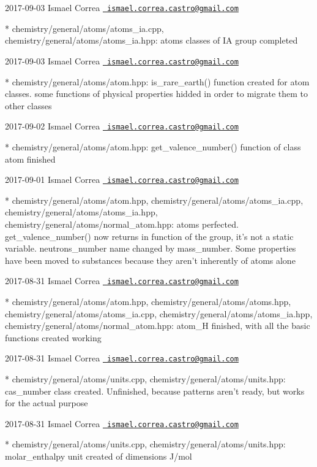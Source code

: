  2017-\/09-\/03 Ismael Correa \href{mailto:ismael.correa.castro@gmail.com}{\texttt{ ismael.\+correa.\+castro@gmail.\+com}} \begin{DoxyVerb}* chemistry/general/atoms/atoms_ia.cpp,
chemistry/general/atoms/atoms_ia.hpp: atoms classes of IA group
completed
\end{DoxyVerb}
 2017-\/09-\/03 Ismael Correa \href{mailto:ismael.correa.castro@gmail.com}{\texttt{ ismael.\+correa.\+castro@gmail.\+com}} \begin{DoxyVerb}* chemistry/general/atoms/atom.hpp: is_rare_earth() function created
for atom classes. some functions of physical properties hidded in
order to migrate them to other classes
\end{DoxyVerb}
 2017-\/09-\/02 Ismael Correa \href{mailto:ismael.correa.castro@gmail.com}{\texttt{ ismael.\+correa.\+castro@gmail.\+com}} \begin{DoxyVerb}* chemistry/general/atoms/atom.hpp: get_valence_number() function of
class atom finished
\end{DoxyVerb}
 2017-\/09-\/01 Ismael Correa \href{mailto:ismael.correa.castro@gmail.com}{\texttt{ ismael.\+correa.\+castro@gmail.\+com}} \begin{DoxyVerb}* chemistry/general/atoms/atom.hpp,
chemistry/general/atoms/atoms_ia.cpp,
chemistry/general/atoms/atoms_ia.hpp,
chemistry/general/atoms/normal_atom.hpp: atoms perfected.
get_valence_number() now returns in function of the group, it's not
a static variable. neutrons_number name changed by mass_number. Some
properties have been moved to substances because they aren't
inherently of atoms alone
\end{DoxyVerb}
 2017-\/08-\/31 Ismael Correa \href{mailto:ismael.correa.castro@gmail.com}{\texttt{ ismael.\+correa.\+castro@gmail.\+com}} \begin{DoxyVerb}* chemistry/general/atoms/atom.hpp,
chemistry/general/atoms/atoms.hpp,
chemistry/general/atoms/atoms_ia.cpp,
chemistry/general/atoms/atoms_ia.hpp,
chemistry/general/atoms/normal_atom.hpp: atom_H finished, with all
the basic functions created working
\end{DoxyVerb}
 2017-\/08-\/31 Ismael Correa \href{mailto:ismael.correa.castro@gmail.com}{\texttt{ ismael.\+correa.\+castro@gmail.\+com}} \begin{DoxyVerb}* chemistry/general/atoms/units.cpp,
chemistry/general/atoms/units.hpp: cas_number class created.
Unfinished, because patterns aren't ready, but works for the actual
purpose
\end{DoxyVerb}
 2017-\/08-\/31 Ismael Correa \href{mailto:ismael.correa.castro@gmail.com}{\texttt{ ismael.\+correa.\+castro@gmail.\+com}} \begin{DoxyVerb}* chemistry/general/atoms/units.cpp,
chemistry/general/atoms/units.hpp: molar_enthalpy unit created of
dimensions J/mol
\end{DoxyVerb}
